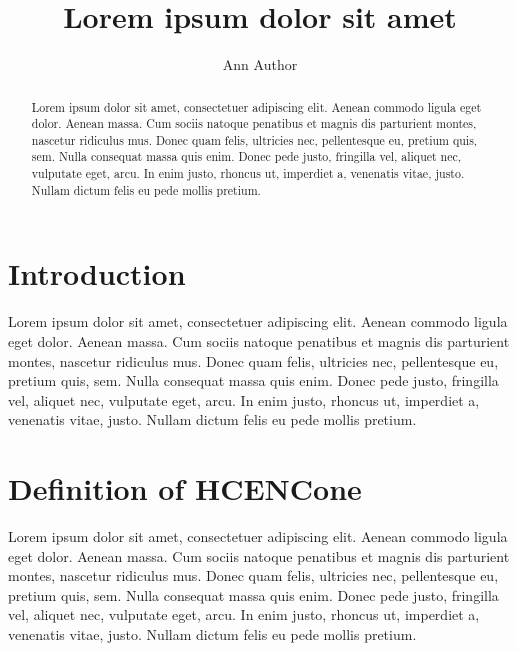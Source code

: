 \documentclass{article}
\title{Lorem ipsum dolor sit amet}
\author{Ann Author}
\begin{document}
\maketitle

\begin{abstract}
Lorem ipsum dolor sit amet, consectetuer adipiscing elit. Aenean commodo ligula
eget dolor. Aenean massa. Cum sociis natoque penatibus et magnis dis parturient
montes, nascetur ridiculus mus. Donec quam felis, ultricies nec, pellentesque
eu, pretium quis, sem. Nulla consequat massa quis enim. Donec pede justo,
fringilla vel, aliquet nec, vulputate eget, arcu. In enim justo, rhoncus ut,
imperdiet a, venenatis vitae, justo. Nullam dictum felis eu pede mollis pretium.
\end{abstract}


\section{Introduction}
\label{sec:introduction}
Lorem ipsum dolor sit amet, consectetuer adipiscing elit. Aenean commodo ligula
eget dolor. Aenean massa. Cum sociis natoque penatibus et magnis dis parturient
montes, nascetur ridiculus mus. Donec quam felis, ultricies nec, pellentesque
eu, pretium quis, sem. Nulla consequat massa quis enim. Donec pede justo,
fringilla vel, aliquet nec, vulputate eget, arcu. In enim justo, rhoncus ut,
imperdiet a, venenatis vitae, justo. Nullam dictum felis eu pede mollis pretium.

\section{Definition of HCENCone}
\label{sec:definition}

Lorem ipsum dolor sit amet, consectetuer adipiscing elit. Aenean commodo ligula
eget dolor. Aenean massa. Cum sociis natoque penatibus et magnis dis parturient
montes, nascetur ridiculus mus. Donec quam felis, ultricies nec, pellentesque
eu, pretium quis, sem. Nulla consequat massa quis enim. Donec pede justo,
fringilla vel, aliquet nec, vulputate eget, arcu. In enim justo, rhoncus ut,
imperdiet a, venenatis vitae, justo. Nullam dictum felis eu pede mollis pretium.
\end{document}
